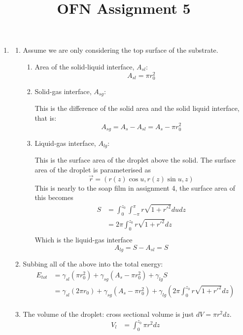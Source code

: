 \documentclass{X:/Documents/Coding/Latex/myassignment}
\title{OFN Assignment 5}
\begin{document}

\maketitle
\begin{enumerate}
	\item 
\begin{enumerate}
	\item Assume we are only considering the top surface of the substrate.
	\begin{enumerate}
		\item Area of the solid-liquid interface, $A_{sl}$:
		\[A_{sl} = \pi r_0^2\]
		\item Solid-gas interface, $A_{sg}$:

		This is the difference of the solid area and the solid liquid interface, that is:
		\[A_{sg} = A_s - A_{sl} = A_s - \pi r_0^2\]

		\item Liquid-gas interface, $A_{lg}$:

		This is the surface area of the droplet above the solid. The surface area of the droplet is parameterised as
		\[\vec r = \left(r(z)\cos u,r(z)\sin u,z\right)\]
		This is nearly to the soap film in assignment 4, the surface area of this becomes
		\begin{align*}
			S &= \int_{0}^{z_0} \int_{-\pi}^{\pi} r\sqrt{1+r'^2} dudz\\
			&= 2\pi  \int_{0}^{z_0} r\sqrt{1+r'^2} dz\\
		\end{align*}
		Which is the liquid-gas interface
		\[A_{lg} = S -A_{sl} = S \]
	\end{enumerate}
	\item Subbing all of the above into the total energy:
	\begin{align*}
		E_{tot} &= \gamma_{sl}\left(\pi r_0^2\right) + \gamma_{sg}\left(A_s - \pi r_0^2\right) + \gamma_{lg}S\\
		&= \gamma_{sl}\left(2\pi r_0\right) + \gamma_{sg}\left(A_s - \pi r_0^2\right) + \gamma_{lg}\left(2\pi \int_{0}^{z_0} r\sqrt{1+r'^2} dz\right)\\
	\end{align*}
	\item The volume of the droplet: cross sectional volume is just $dV = \pi r^2 dz$. 
	\begin{align*}
		V_l &= \int_0^{z_0}\pi r^2 dz\\
	\end{align*}


\end{enumerate}
\end{enumerate}
\end{document}
